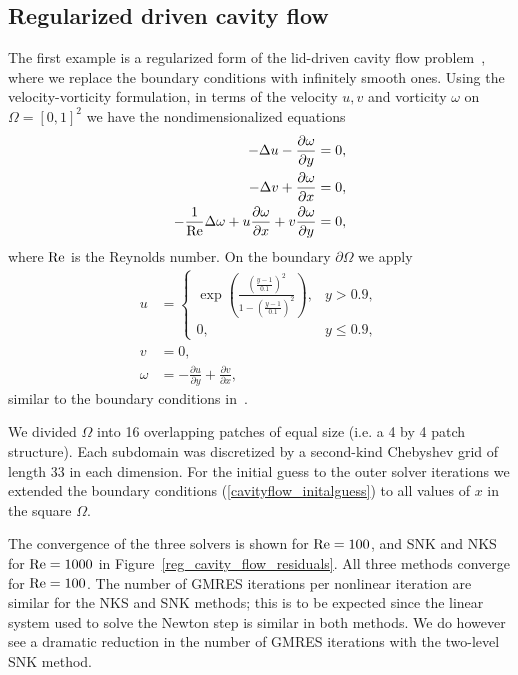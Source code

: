 \subsection{Regularized driven cavity flow}
\label{sec:cavity}
The first example is a regularized form of the lid-driven cavity flow problem~\cite{hirsch2007numerical}, where we replace the boundary conditions with infinitely smooth ones. Using the velocity-vorticity formulation, in terms of the velocity $u,v$ and vorticity $\omega$ on $\Omega = [0,1]^2$ we have the nondimensionalized equations
\begin{equation}
  \begin{aligned}
    -\Delta u - \frac{\partial \omega}{\partial y} &=0, \\
    -\Delta v + \frac{\partial \omega}{\partial x} &=0, \\
    -\frac{1}{\text{Re}} \Delta \omega + u \frac{\partial \omega}{\partial x} + v \frac{\partial \omega}{\partial y} &=0,
  \end{aligned}
  \label{reg_cavity_flow}
\end{equation}
where $\text{Re}$ is the Reynolds number. On the boundary $\partial \Omega$ we apply
\begin{equation}
  \begin{aligned}
    u &= \begin{cases}
      \exp \left(\frac{\left(\frac{y-1}{0.1}\right)^2}{1-\left(\frac{y-1}{0.1}\right)^2}\right), & y>0.9, \\
      0, & y \leq 0.9,
    \end{cases} \\
    v &= 0, \\
    \omega &= - \frac{\partial u}{\partial y} + \frac{\partial v}{\partial x},
  \end{aligned}
  \label{cavityflow_initalguess}
\end{equation}
similar to the boundary conditions in~\cite{shen1990numerical}.

We divided $\Omega$ into 16 overlapping patches of equal size (i.e. a 4 by 4 patch structure). Each subdomain was discretized by a second-kind Chebyshev grid of length 33 in each dimension. For the initial guess to the outer solver iterations we extended the boundary conditions (\ref{cavityflow_initalguess}) to all values of $x$ in the square $\Omega$. 

The convergence of the three solvers is shown for $\text{Re}=100$, and SNK and NKS for $\text{Re} = 1000$ in Figure~\ref{reg_cavity_flow_residuals}. All three methods converge for $\text{Re} = 100$. The number of GMRES iterations per nonlinear iteration are similar for the NKS and SNK methods; this is to be expected since the linear system used to solve the Newton step is similar in both methods. We do however see a dramatic reduction in the number of GMRES iterations with the two-level SNK method. 

